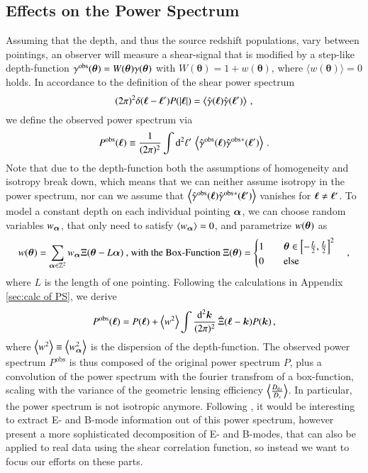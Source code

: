 \subsection{Effects on the Power Spectrum}
Assuming that the depth, and thus the source redshift populations, vary between pointings, an observer will measure a shear-signal that is modified by a step-like depth-function $\gamma^{\text{obs}}(\bm{\theta})=W(\bm{\theta})\gamma(\bm{\theta})$ with $W(\bm{\theta}) = 1+w(\bm{\theta})$, where $\langle w(\bm{\theta})\rangle=0$ holds. 
In accordance to the definition of the shear power spectrum \begin{equation}
(2\pi)^2\delta(\bm{\ell}-\bm{\ell}')P(|\bm{\ell}|) = \left< \hat{\gamma}(\bm{\ell})\hat{\gamma}(\bm{\ell}')\right> \, ,
\end{equation}
we define the observed power spectrum via \begin{equation}
P^{\text{obs}}(\bm{\ell}) \equiv \frac{1}{(2\pi)^2}\int \mathrm{d}^2 \ell'\,  \left< \hat{\gamma}^{\text{obs}}(\bm{\ell}) \hat{\gamma}^{\text{obs}} {}^*(\bm{\ell}')\right> \, .
\end{equation}
Note that due to the depth-function both the assumptions of homogeneity and isotropy break down, which means that we can neither assume isotropy in the power spectrum, nor can we assume that $\left< \hat{\gamma}^{\text{obs}}(\bm{\ell}) \hat{\gamma}^{\text{obs}} {}^*(\bm{\ell}')\right>$ vanishes for $\bm{\ell}\neq\bm{\ell}'$.
To model a constant depth on each individual pointing $\bm{\alpha}$, we can choose random variables $w_{\bm{\alpha}}$, that only need to satisfy $\langle w_{\bm{\alpha}}\rangle=0$, and parametrize $w(\bm{\theta})$ as 
\begin{equation}
w(\bm{\theta}) = \sum_{\bm{\alpha} \in \mathbb{Z}^2} w_{\bm{\alpha}} \Xi(\bm{\theta}-L\bm{\alpha})\text{ , with the Box-Function } \Xi(\bm{\theta}) = \begin{cases}
1 \qquad \bm{\theta}\in \left[-\frac{L}{2},\frac{L}{2}\right]^2 \\
0 \qquad \text{else}
\end{cases},
\label{eq:defweightf}
\end{equation}
where $L$ is the length of one pointing.
Following the calculations in Appendix \ref{sec:calc of PS}, we derive 
\begin{equation}
P^{\text{obs}}(\bm{\ell})  =  P(\bm{\ell}) + \left< w^2\right> \int\frac{\text{d}^2\bm{k}}{(2\pi)^2}\,\hat{\Xi}(\bm{\ell}-\bm{k})P(\bm{k})\, ,
\end{equation}
where $\left< w^2\right> \equiv \left< w_{\bm{\alpha}}^2\right>$ is the dispersion of the depth-function.
The observed power spectrum $P^{\text{obs}}$ is thus composed of the original power spectrum $P$, plus a convolution of the power spectrum with the fourier transfrom of a box-function, scaling with the variance of the geometric lensing efficiency $\left< \frac{D_{\mathrm ds}}{D_{s}}\right>$. In particular, the power spectrum is not isotropic anymore. Following \citet{2002A&A...389..729S}, it would be interesting to extract E- and B-mode information out of this power spectrum, however \citet{2010A&A...520A.116S} present a more sophisticated decomposition of E- and B-modes, that can also be applied to real data using the shear correlation function, so instead we want to focus our efforts on these parts.
